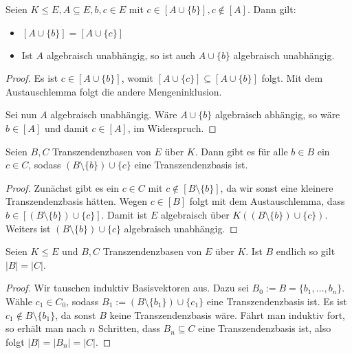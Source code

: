 \begin{corollary}
    Seien $K \leq E, A \subseteq E, b, c \in E$ mit $c \in [A \cup \{b\}], c \notin [A]$. Dann gilt:
    \begin{itemize}
        \item $[A \cup \{b\}] = [A \cup \{c\}]$
        \item Ist $A$ algebraisch unabhängig, so ist auch $A \cup \{ b \}$ algebraisch unabhängig.
    \end{itemize}
\end{corollary}

\begin{proof}
    Es ist $c \in [A \cup \{b\}]$, womit $[A \cup \{c\}] \subseteq [A \cup \{b\}]$ folgt. Mit dem Austauschlemma folgt die andere Mengeninklusion.

    Sei nun $A$ algebraisch unabhängig. Wäre $A \cup \{ b \}$ algebraisch abhängig, so wäre $b \in [A]$ und damit $c \in [A]$, im Widerspruch.
\end{proof}

\begin{corollary}
    Seien $B, C$ Transzendenzbasen von $E$ über $K$. Dann gibt es für alle $b \in B$ ein $c \in C$, sodass $(B \setminus \{b\}) \cup \{c\}$ eine Transzendenzbasis ist.
\end{corollary}

\begin{proof}
    Zunächst gibt es ein $c \in C$ mit $c \notin [B \setminus \{b\}]$, da wir sonst eine kleinere Transzendenzbasis hätten. Wegen $c \in [B]$ folgt mit dem Austauschlemma, dass $b \in [(B \setminus \{b\}) \cup \{c\}]$. Damit ist $E$ algebraisch über $K((B \setminus \{b\}) \cup \{c\})$. Weiters ist $(B \setminus \{b\}) \cup \{c\}$ algebraisch unabhängig.
\end{proof}

\begin{lemma}
    Seien $K \leq E$ und $B, C$ Transzendenzbasen von $E$ über $K$. Ist $B$ endlich so gilt $\vert B \vert = \vert C \vert$.
\end{lemma}

\begin{proof}
    Wir tauschen induktiv Basisvektoren aus. Dazu sei $B_0:=B=\{b_1,\ldots,b_n\}$. Wähle $c_1 \in C_0$, sodass $B_{1}:=(B\setminus\{b_1\})\cup\{c_1\}$ eine Transzendenzbasis ist. Es ist $c_1\not\in B\setminus\{b_1\}$, da sonst $B$ keine Transzendenzbasis wäre. Fährt man induktiv fort, so erhält man nach $n$ Schritten, dass $B_n\subseteq C$ eine Transzendenzbasis ist, also folgt
    $|B|=|B_n|=|C|$.
\end{proof}

